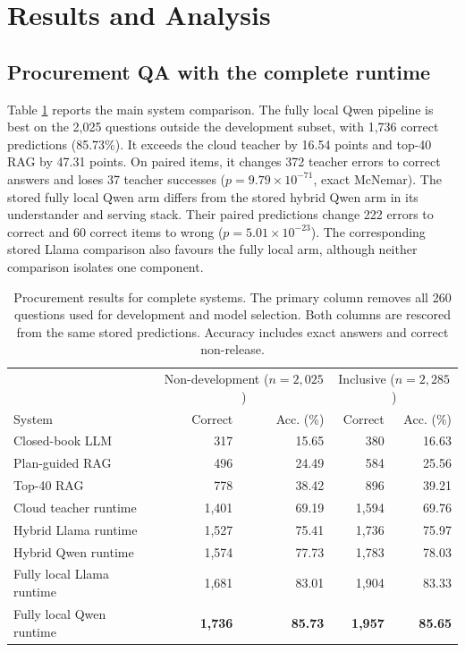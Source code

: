 \section{Results and Analysis}
\label{sec:results}

\subsection{Procurement QA with the complete runtime}

Table \ref{tab:main-results} reports the main system comparison.  The fully local Qwen pipeline is
best on the 2,025 questions outside the development subset, with 1,736 correct predictions (85.73\%).
It exceeds the cloud teacher by 16.54 points and top-40 RAG by 47.31 points.  On paired items, it
changes 372 teacher errors to correct answers and loses 37 teacher successes
($p=9.79\times10^{-71}$, exact McNemar).  The stored fully local Qwen arm differs from the stored
hybrid Qwen arm in its understander and serving stack.  Their paired predictions change 222 errors
to correct and 60 correct items to wrong ($p=5.01\times10^{-23}$).  The corresponding stored Llama
comparison also favours the fully local arm, although neither comparison isolates one component.

\begin{table}[t]
  \centering
  \caption{Procurement results for complete systems.  The primary column removes all 260 questions used for
  development and model selection.  Both columns are rescored from the same stored predictions.
  Accuracy includes exact answers and correct non-release.}
  \label{tab:main-results}
  \small
  \begin{tabular}{lrrrr}
    \toprule
    & \multicolumn{2}{c}{Non-development ($n=2{,}025$)} &
      \multicolumn{2}{c}{Inclusive ($n=2{,}285$)} \\
    System & Correct & Acc. (\%) & Correct & Acc. (\%) \\
    \midrule
    Closed-book LLM & 317 & 15.65 & 380 & 16.63 \\
    Plan-guided RAG & 496 & 24.49 & 584 & 25.56 \\
    Top-40 RAG & 778 & 38.42 & 896 & 39.21 \\
    Cloud teacher runtime & 1,401 & 69.19 & 1,594 & 69.76 \\
    Hybrid Llama runtime & 1,527 & 75.41 & 1,736 & 75.97 \\
    Hybrid Qwen runtime & 1,574 & 77.73 & 1,783 & 78.03 \\
    Fully local Llama runtime & 1,681 & 83.01 & 1,904 & 83.33 \\
    Fully local Qwen runtime & \textbf{1,736} & \textbf{85.73} & \textbf{1,957} & \textbf{85.65} \\
    \bottomrule
  \end{tabular}
\end{table}

